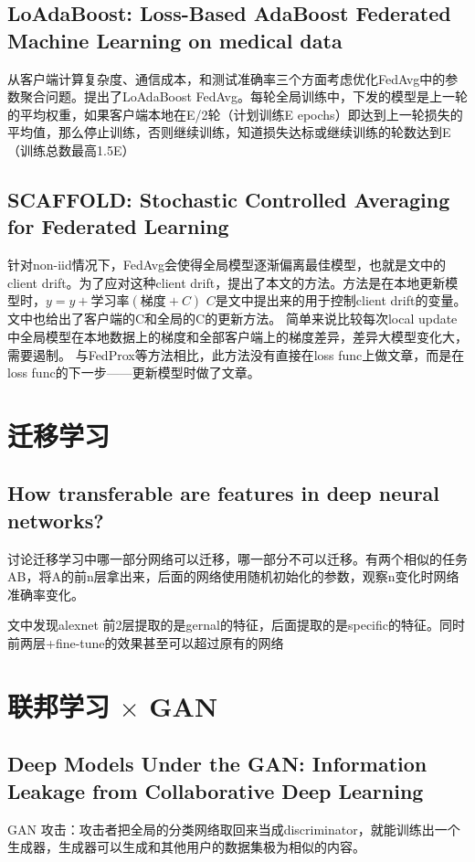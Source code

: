 \documentclass[12pt, a4paper]{article}
\begin{document}
        \subsection*{LoAdaBoost: Loss-Based AdaBoost Federated Machine Learning on medical data}
            从客户端计算复杂度、通信成本，和测试准确率三个方面考虑优化FedAvg中的参数聚合问题。提出了LoAdaBoost FedAvg。每轮全局训练中，下发的模型是上一轮的平均权重，如果客户端本地在E/2轮（计划训练E epochs）即达到上一轮损失的平均值，那么停止训练，否则继续训练，知道损失达标或继续训练的轮数达到E（训练总数最高1.5E）
            
        \subsection*{SCAFFOLD: Stochastic Controlled Averaging for Federated Learning}
            针对non-iid情况下，FedAvg会使得全局模型逐渐偏离最佳模型，也就是文中的client drift。为了应对这种client drift，提出了本文的方法。方法是在本地更新模型时，$ y= y + 学习率(梯度+C) $ $ C $是文中提出来的用于控制client drift的变量。文中也给出了客户端的C和全局的C的更新方法。
            简单来说比较每次local update中全局模型在本地数据上的梯度和全部客户端上的梯度差异，差异大模型变化大，需要遏制。
            与FedProx等方法相比，此方法没有直接在loss func上做文章，而是在loss func的下一步——更新模型时做了文章。

    \section*{迁移学习}
        \subsection*{How transferable are features in deep neural networks?}
        讨论迁移学习中哪一部分网络可以迁移，哪一部分不可以迁移。有两个相似的任务AB，将A的前n层拿出来，后面的网络使用随机初始化的参数，观察n变化时网络准确率变化。

        文中发现alexnet 前2层提取的是gernal的特征，后面提取的是specific的特征。同时前两层+fine-tune的效果甚至可以超过原有的网络

    \section*{联邦学习 $ \times $ GAN}
        \subsection*{Deep Models Under the GAN: Information Leakage from Collaborative Deep Learning}
            GAN 攻击：攻击者把全局的分类网络取回来当成discriminator，就能训练出一个生成器，生成器可以生成和其他用户的数据集极为相似的内容。
\end{document}
